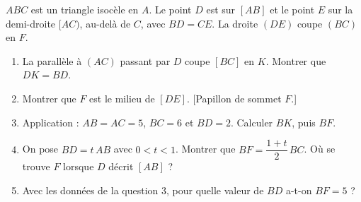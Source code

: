 
$ABC$ est un triangle isocèle en $A$. Le point $D$ est sur $[AB]$ et le point $E$ sur la demi-droite $[AC)$, au-delà de $C$, avec $BD=CE$. La droite $(DE)$ coupe $(BC)$ en $F$.
\begin{center}
\end{center}
\begin{enumerate}
  \item La parallèle à $(AC)$ passant par $D$ coupe $[BC]$ en $K$. Montrer que $DK=BD$.
  \item Montrer que $F$ est le milieu de $[DE]$. [Papillon de sommet $F$.]
  \item Application : $AB=AC=5$, $BC=6$ et $BD=2$. Calculer $BK$, puis $BF$.
  \item On pose $BD=t\,AB$ avec $0<t<1$. Montrer que $BF=\dfrac{1+t}2\,BC$. Où se trouve $F$ lorsque $D$ décrit $[AB]$ ?
  \item Avec les données de la question 3, pour quelle valeur de $BD$ a-t-on $BF=5$ ?
\end{enumerate}

